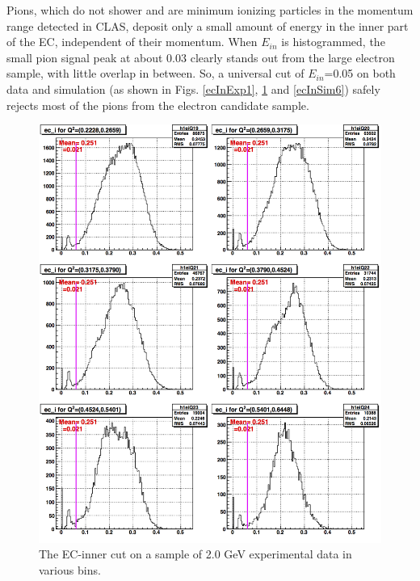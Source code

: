 Pions, which do not shower and are minimum ionizing particles in the momentum range detected in CLAS, deposit only a small amount of energy in the inner part of the EC, %
independent of their momentum. When $E_{in}$ is histogrammed, the small pion signal peak at about 0.03 clearly stands out from the large electron sample, with little overlap in between. So, a universal cut of $E_{in}$=0.05 on both data and simulation (as shown in Figs. \ref{ecInExp1}, \ref{ecInExp6} and \ref{ecInSim6}) safely rejects most of the pions from the electron candidate sample. 


\begin{figure}[H]%
\centering
\leavevmode \includegraphics[width=1.0\textwidth]{figuresEG4/FigCuts/ecCuts_eiOneD_Eb2_4ThN.png}  %
\caption[EC inner energy cut (Exp.)]{The EC-inner cut on a sample of 2.0 GeV experimental data in various \qsqs bins.}
\label{ecInExp6}
\end{figure}



